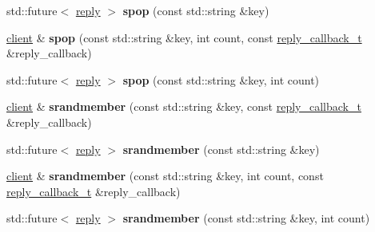 \begin{DoxyCompactItemize}
\item 
\mbox{\label{classcpp__redis_1_1client_aabd8e3ddf02299eb129af8ad27555282}} 
std\+::future$<$ \mbox{\hyperlink{classcpp__redis_1_1reply}{reply}} $>$ {\bfseries spop} (const std\+::string \&key)
\item 
\mbox{\label{classcpp__redis_1_1client_a75a34f373c405999036a1e7e476ff201}} 
\mbox{\hyperlink{classcpp__redis_1_1client}{client}} \& {\bfseries spop} (const std\+::string \&key, int count, const \mbox{\hyperlink{classcpp__redis_1_1client_af7a65eb21aa25230bfbb0b0203c4fc04}{reply\+\_\+callback\+\_\+t}} \&reply\+\_\+callback)
\item 
\mbox{\label{classcpp__redis_1_1client_acde89afde549cbe7ead5453fd3635081}} 
std\+::future$<$ \mbox{\hyperlink{classcpp__redis_1_1reply}{reply}} $>$ {\bfseries spop} (const std\+::string \&key, int count)
\item 
\mbox{\label{classcpp__redis_1_1client_a69e771fb9562fca08cbf653f8ecb295b}} 
\mbox{\hyperlink{classcpp__redis_1_1client}{client}} \& {\bfseries srandmember} (const std\+::string \&key, const \mbox{\hyperlink{classcpp__redis_1_1client_af7a65eb21aa25230bfbb0b0203c4fc04}{reply\+\_\+callback\+\_\+t}} \&reply\+\_\+callback)
\item 
\mbox{\label{classcpp__redis_1_1client_a2a110009cac1bb5063d468df91802395}} 
std\+::future$<$ \mbox{\hyperlink{classcpp__redis_1_1reply}{reply}} $>$ {\bfseries srandmember} (const std\+::string \&key)
\item 
\mbox{\label{classcpp__redis_1_1client_a59e0a8886b5f4fa177e93053b9965827}} 
\mbox{\hyperlink{classcpp__redis_1_1client}{client}} \& {\bfseries srandmember} (const std\+::string \&key, int count, const \mbox{\hyperlink{classcpp__redis_1_1client_af7a65eb21aa25230bfbb0b0203c4fc04}{reply\+\_\+callback\+\_\+t}} \&reply\+\_\+callback)
\item 
\mbox{\label{classcpp__redis_1_1client_a23913f257f58864d865d70bfe462caa4}} 
std\+::future$<$ \mbox{\hyperlink{classcpp__redis_1_1reply}{reply}} $>$ {\bfseries srandmember} (const std\+::string \&key, int count)

\end{DoxyCompactItemize}
